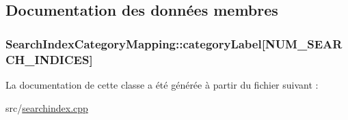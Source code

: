 \subsection{Documentation des données membres}
\hypertarget{class_search_index_category_mapping_ae7c4cb02a9c5e25fd321b73c8ea7b826}{}
\subsubsection[{category\+Label}]{ Search\+Index\+Category\+Mapping\+::category\+Label\mbox{[}{\bf N\+U\+M\+\_\+\+S\+E\+A\+R\+C\+H\+\_\+\+I\+N\+D\+I\+C\+E\+S}\mbox{]}}\label{class_search_index_category_mapping_ae7c4cb02a9c5e25fd321b73c8ea7b826}


La documentation de cette classe a été générée à partir du fichier suivant \+:\begin{DoxyCompactItemize}
\item 
src/\hyperlink{searchindex_8cpp}{searchindex.\+cpp}\end{DoxyCompactItemize}
